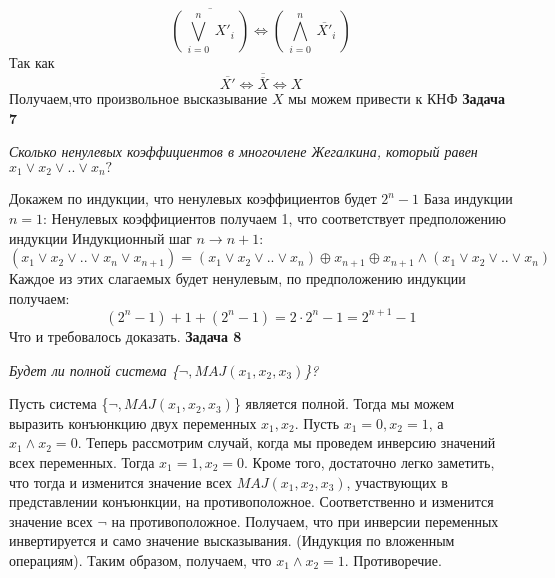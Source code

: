 \documentclass{article}
\begin{document}
$$\overline{\left (~\bigvee_{i=0}^{n} ~ X'_i~\right)} \Longleftrightarrow \left (~\bigwedge_{i=0}^{n} ~ \overline{X'}_i~\right)$$
Так как $$\overline{X'}\Leftrightarrow\overline{\overline{X}}\Leftrightarrow X$$
Получаем,что произвольное высказывание $X$ мы можем привести к КНФ 
\newline
\newline \newline
 \noindent \textbf{Задача 7}
\begin{center}
\textit{Сколько ненулевых коэффициентов в многочлене Жегалкина, который равен $x_1\vee x_2\vee..\vee x_n?$}
\end{center}
Докажем по индукции, что ненулевых коэффициентов будет $2^n - 1$
База индукции $n = 1$: 
Ненулевых коэффициентов получаем 1, что соответствует предположению индукции \newline
Индукционный шаг $n \rightarrow n+1$:
$$(x_1\vee x_2\vee..\vee x_n \vee x_{n+1}) =  (x_1\vee x_2\vee..\vee x_n) \oplus x_{n+1} \oplus x_{n+1}\wedge (x_1\vee x_2\vee..\vee x_n)$$
Каждое из этих слагаемых будет ненулевым, по предположению индукции получаем:
$$(2^n-1) + 1 + (2^n - 1) = 2 \cdot 2^n -1 = 2^{n+1}-1$$
Что и требовалось доказать.
\newline
\newline 
\noindent \textbf{Задача 8}
\begin{center}
\textit{Будет ли полной система \{$\neg , MAJ(x_1, x_2, x_3)$\}?}
\end{center}
Пусть система \{$\neg , MAJ(x_1, x_2, x_3)$\} является полной. Тогда мы можем выразить конъюнкцию двух переменных $x_1, x_2$. Пусть $x_1 = 0, x_2 = 1$, а $x_1 \wedge x_2 = 0$. Теперь рассмотрим случай, когда мы проведем инверсию значений всех переменных. Тогда $x_1 = 1, x_2 = 0$. Кроме того, достаточно легко заметить, что тогда и изменится значение всех $MAJ(x_1, x_2, x_3)$, участвующих в представлении конъюнкции, на противоположное. Соответственно и изменится значение всех $\neg$ на противоположное. Получаем, что при инверсии переменных инвертируется и само значение высказывания. (Индукция по вложенным операциям). Таким образом, получаем, что $x_1 \wedge x_2 = 1$. Противоречие.
\newline
 \newline
\end{document}
